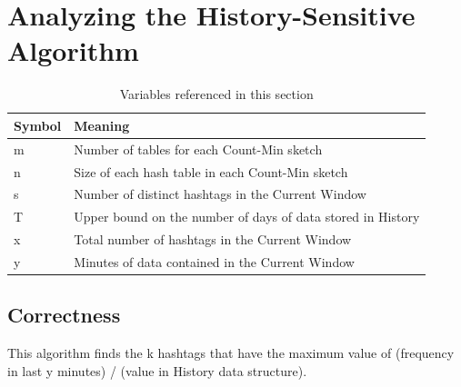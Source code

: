 \documentclass[twoside]{article}
\begin{document}

\section{Analyzing the History-Sensitive Algorithm}

\begin{table}[h]
\centering
\begin{tabular}{@{}ll@{}}
\toprule
Symbol & Meaning                                                           \\ \midrule
m      & Number of tables for each Count-Min sketch                        \\
n      & Size of each hash table in each Count-Min sketch                  \\
s      & Number of distinct hashtags in the Current Window                 \\
T      & Upper bound on the number of days of data stored in History \\
x      & Total number of hashtags in the Current Window                   \\
y      & Minutes of data contained in the Current Window                   \\ \bottomrule
\end{tabular}
\caption{Variables referenced in this section}
\end{table}

\subsection{Correctness} \label{sec:Correctness}

This algorithm finds the k hashtags that have the maximum value of (frequency in last y minutes) / (value in History data structure).
\end{document}
